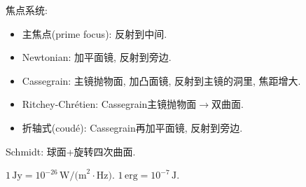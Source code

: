 焦点系统:
\begin{itemize}
    \item 主焦点(prime focus): 反射到中间.
    \item Newtonian: 加平面镜, 反射到旁边.
    \item Cassegrain: 主镜抛物面, 加凸面镜, 反射到主镜的洞里, 焦距增大.
    \item Ritchey-Chr\'etien: Cassegrain主镜抛物面$\to$双曲面.
    \item 折轴式(coud\'e): Cassegrain再加平面镜, 反射到旁边.
\end{itemize}

Schmidt: 球面+旋转四次曲面.

$1\,\text{Jy}=10^{-26}\,\text{W/(m}^2\!\cdot\text{Hz)}$. $1\,\text{erg}=10^{-7}\,\text{J}$.
